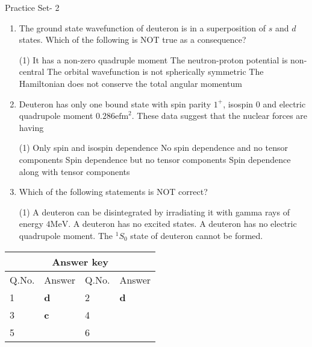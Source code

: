 \newpage
\begin{abox}
	Practice Set- 2
	\end{abox}
\begin{enumerate}
\item The ground state wavefunction of deuteron is in a superposition of $s$ and $d$ states. Which of the following is NOT true as a consequence?
{}
\begin{tasks}(1)
	\task[\textbf{A.}] It has a non-zero quadruple moment 
	\task[\textbf{B.}]The neutron-proton potential is non-central
	\task[\textbf{C.}] The orbital wavefunction is not spherically symmetric
	\task[\textbf{D.}]The Hamiltonian does not conserve the total angular momentum
\end{tasks}
\item Deuteron has only one bound state with spin parity $1^{+}$, isospin 0 and electric quadrupole moment $0.286 \mathrm{efm}^{2}$. These data suggest that the nuclear forces are having
{}
\begin{tasks}(1)
	\task[\textbf{A.}] Only spin and isospin dependence
	\task[\textbf{B.}] No spin dependence and no tensor components
	\task[\textbf{C.}]Spin dependence but no tensor components
	\task[\textbf{D.}]Spin dependence along with tensor components
\end{tasks}
\item Which of the following statements is NOT correct?
{}
\begin{tasks}(1)
	\task[\textbf{A.}] A deuteron can be disintegrated by irradiating it with gamma rays of energy $4 \mathrm{MeV}$.
	\task[\textbf{B.}] A deuteron has no excited states.
	\task[\textbf{C.}] A deuteron has no electric quadrupole moment.
	\task[\textbf{D.}] The ${ }^{1} S_{0}$ state of deuteron cannot be formed.
\end{tasks}	
\end{enumerate}
\setlength\arrayrulewidth{1pt}
\begin{table}[H]
	\centering
	\begin{tabular}{|p{1.5cm}|p{1.5cm}||p{1.5cm}|p{1.5cm}|}
		\hline
		\multicolumn{4}{|c|}{\textbf{Answer key}}\\\hline\hline
		\rowcolor{ocrel}Q.No.&Answer&Q.No.&Answer\\\hline
		1&\textbf{d} &2&\textbf{d}\\\hline 
		3&\textbf{c} &4&\textbf{} \\\hline
		5&\textbf{} &6&\textbf{} \\\hline
		
	\end{tabular}
\end{table}



